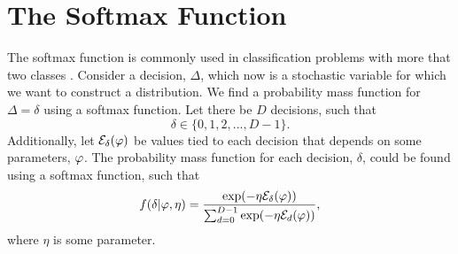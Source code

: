 






\section{The Softmax Function} \label{section_theory_softmax}
The softmax function is commonly used in classification problems with more that two classes \citep{softmax}. Consider a decision, $\Delta$, which now is a stochastic variable for which we want to construct a distribution. We find a probability mass function for $\Delta=\delta$ using a softmax function. Let there be $D$ decisions, such that
\begin{equation*}
    \delta \in \{0,1,2,...,D-1\}.
\end{equation*}
Additionally, let $\mathcal{E}_{\delta}(\varphi)$ be values tied to each decision that depends on some parameters, $\varphi$. The probability mass function for each decision, $\delta$, could be found using a softmax function, such that
\begin{equation}
\label{softmax_in_theory}
    \begin{aligned}
        f(\delta|\varphi,\eta) = \frac{\text{exp}(- \eta \mathcal{E}_{\delta}(\varphi))}{\sum_{d=0}^{D-1} \text{exp}(-\eta \mathcal{E}_{d}(\varphi))},
    \end{aligned}
\end{equation}
where $\eta$ is some parameter. 

